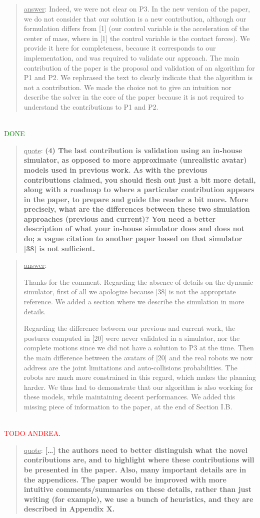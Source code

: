 \documentclass[a4paper]{article}
\newcommand{\done}[0]{\textcolor{green}{DONE}}
\newcommand\quot[1]{\begin{quote} \underline{quote}: \textbf{#1}\end{quote}}
\newcommand\as[1]{\begin{quote} \underline{answer}: {#1}\end{quote} \leavevmode \\ }
\begin{document}
\as{Indeed, we were not clear on P3. In the new version of the paper, we do not consider that our solution
is a new contribution, although our formulation differs from [1] (our control variable is the acceleration
of the center of mass, where in [1] the control variable is the contact forces). We provide it here for completeness, because it corresponds to our implementation, and 
was required to validate our approach. The main contribution of the paper is the proposal and validation of an algorithm for P1 and P2.
We rephrased the text to clearly indicate that the algorithm is not a contribution. We made the choice not to give an intuition nor describe the solver in the core
of the paper because it is not required to understand the contributions to P1 and P2.}\done


\quot{
(4)	The last contribution is validation using an in-house
simulator, as opposed to more approximate (unrealistic avatar) models
used in previous work.	As with the previous contributions claimed, you
should flesh out just a bit more detail, along with a roadmap to where
a particular contribution appears in the paper, to prepare and guide
the reader a bit more. More precisely, what are the differences between
these two simulation approaches (previous and current)? You need a
better description of what your in-house simulator does and does not
do; a vague citation to another paper based on that simulator [38] is
not sufficient.}

\as{Thanks for the comment. Regarding the absence of details on the dynamic simulator, first of all we apologize because [38] is not the appropriate reference.
We added a section where we describe the simulation in more details. 

Regarding the difference between our previous and current work, the postures computed in [20] were never validated in a simulator, nor the complete motions since 
we did not have a solution to P3 at the time. Then the main
difference between the avatars of [20] and the real robots we now address are the joint limitations and auto-collisions probabilities.
The robots are much more constrained in this regard, which makes the planning harder. We thus had to demonstrate that our algorithm is also working
for these models, while maintaining decent performances.
We added this missing piece of information to the paper, at the end of Section I.B.}
\textcolor{red}{TODO ANDREA}.


\quot{[\dots] the authors need to better
distinguish what the novel contributions are, and to highlight where
these contributions will be presented in the paper.  Also, many
important details are in the appendices. The paper would be improved
with more intuitive comments/summaries on these details, rather than
just writing (for example), we use a bunch of heuristics, and they are
described in Appendix X.}
\end{document}
